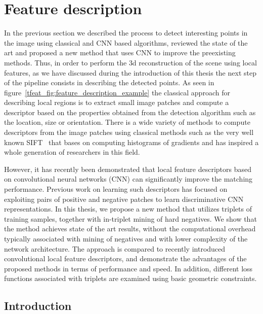 \newpage

\section{Feature description}

In the previous section we described the process to detect interesting points in the image using classical and CNN based algorithms, reviewed the state of the art and proposed a new method that uses CNN to improve the preexisting methods. Thus, in order to perform the 3d reconstruction of the scene using local features, as we have discussed during the introduction of this thesis the next step of the pipeline consists in describing the detected points. As seen in figure~\ref{tfeat_fig:feature_description_example} the classical approach for describing local regions is to extract small image patches and compute a descriptor based on the properties obtained from the detection algorithm such as the location, size or orientation. There is a wide variety of methods to compute descriptors from the image patches using classical methods such as the very well known SIFT~\cite{SIFT} that bases on computing histograms of gradients and has inspired a whole generation of researchers in this field.

However, it has recently been demonstrated that local feature descriptors based on convolutional neural networks (CNN) can significantly improve the matching performance.  Previous work on learning such descriptors has focused on exploiting pairs of positive and negative patches to learn discriminative CNN representations. In this thesis, we propose a new method that utilizes triplets of training samples, together with in-triplet mining of hard negatives. We show that the method achieves state of the art results, without the computational overhead typically associated with mining of negatives and with lower complexity of the network architecture.  The approach is compared to recently introduced convolutional local feature descriptors, and demonstrate the advantages of the proposed methods in terms of performance and speed.  In addition, different loss functions associated with triplets are examined using basic geometric constraints.

\subsection{Introduction}

